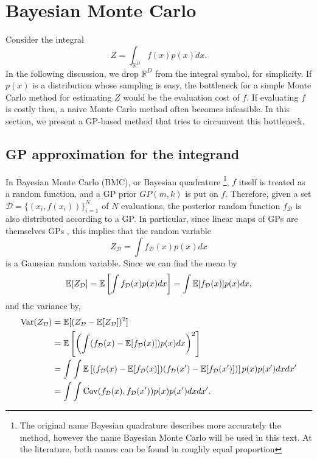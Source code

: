 \chapter{Bayesian Monte Carlo}
Consider the integral
\begin{equation}\label{integralbmc}
Z = \int_{\mathbb{R}^D} f(x) p(x) dx.
\end{equation}
In the following discussion, we drop  $\mathbb{R}^D$ from the integral symbol, for simplicity. If $p(x)$ is a distribution whose sampling is easy, the bottleneck for a simple Monte Carlo method for estimating $Z$ would be the evaluation cost of $f$. If evaluating $f$ is costly then, a naive Monte Carlo method often becomes infeasible. In this section, we present a GP-based method that tries to circumvent this bottleneck. 

\section{GP approximation for the integrand}
In Bayesian Monte Carlo (BMC), or Bayesian quadrature \cite{Ghahramani_2003,O_Hagan_1991} \footnote{The original name Bayesian quadrature describes more accurately the method, however the name Bayesian Monte Carlo will be used in this text. At the literature, both names can be found in roughly equal proportion}, $f$ itself is treated as a random function, and a GP prior $GP(m,k)$ is put on $f$. Therefore, given a set $\mathcal{D} = \{(x_i,f(x_i))\}_{i=1}^N$ of $N$ evaluations, the posterior random function $f_{\mathcal{D}}$ is also distributed according to a GP. In particular, since linear maps of GPs are themselves GPs \cite{Rasmussen06,Hennig_2012}, this implies that the random variable
\begin{equation}\label{bmcrv}
Z_{\mathcal{D}} = \int f_{\mathcal{D}}(x) p(x) dx
\end{equation}
is a Gaussian random variable. Since we can find the mean by 
\begin{equation}\label{evbmc}
\begin{split}
{\mathbb E}[Z_{\mathcal{D}}] = {\mathbb E} \left[\int f_{\mathcal{D}}(x) p(x) dx \right] = \int {\mathbb E}[f_{\mathcal{D}}(x)] p(x) dx,
\end{split}
\end{equation}
and the variance by,
\begin{equation}\label{varbmc}
\begin{split}
\mathrm{Var}(Z_{\mathcal{D}}) & = {\mathbb E}[(Z_{\mathcal{D}} - {\mathbb E}[Z_{\mathcal{D}}])^2] \\
& = {\mathbb E} \left[\left( \int (f_{\mathcal{D}}(x) - {\mathbb E}[f_{\mathcal{D}}(x)]) p(x) dx \right)^2 \right] \\
& = \int \int {\mathbb E} \left[(f_{\mathcal{D}}(x) - {\mathbb E}[f_{\mathcal{D}}(x)]) (f_{\mathcal{D}}(x') - {\mathbb E}[f_{\mathcal{D}}(x')]) \right]  p(x) p(x') dx dx' \\
& = \int \int \mathrm{Cov}(f_{\mathcal{D}}(x),f_{\mathcal{D}}(x')) p(x) p(x') dx dx'.
\end{split}
\end{equation}
